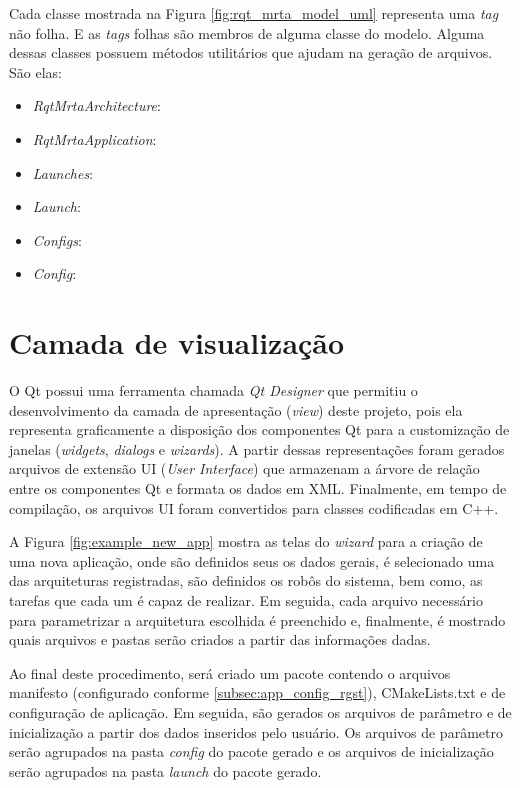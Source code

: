         Cada classe mostrada na Figura \ref{fig:rqt_mrta_model_uml} representa uma \textit{tag} não folha. E as \textit{tags} folhas são membros de alguma classe do modelo. Alguma dessas classes possuem métodos utilitários que ajudam na geração de arquivos. São elas:
        
        \begin{itemize}
            \item \textit{RqtMrtaArchitecture}:
            \item \textit{RqtMrtaApplication}:
            \item \textit{Launches}:
            \item \textit{Launch}:
            \item \textit{Configs}:
            \item \textit{Config}:
            
        \end{itemize}
        
    \section{Camada de visualização} \label{subsec:rqt_mrta_view}
        O Qt \cite{ref:yafei2012qt} possui uma ferramenta chamada \textit{Qt Designer} que permitiu o desenvolvimento da camada de apresentação (\textit{view}) deste projeto, pois ela representa graficamente a disposição dos componentes Qt para a customização de janelas (\textit{widgets}, \textit{dialogs} e \textit{wizards}). A partir dessas representações foram gerados arquivos de extensão UI (\textit{User Interface}) que armazenam a árvore de relação entre os componentes Qt e formata os dados em XML. Finalmente, em tempo de compilação, os arquivos UI foram convertidos para classes codificadas em C++.
        
        A Figura \ref{fig:example_new_app} mostra as telas do \textit{wizard} para a criação de uma nova aplicação, onde são definidos seus os dados gerais, é selecionado uma das arquiteturas registradas, são definidos os robôs do sistema, bem como, as tarefas que cada um é capaz de realizar. Em seguida, cada arquivo necessário para parametrizar a arquitetura escolhida é preenchido e, finalmente, é mostrado quais arquivos e pastas serão criados a partir das informações dadas. 
        
        Ao final deste procedimento, será criado um pacote contendo o arquivos manifesto (configurado conforme \ref{subsec:app_config_rgst}), CMakeLists.txt e de configuração de aplicação. Em seguida, são gerados os arquivos de parâmetro e de inicialização a partir dos dados inseridos pelo usuário. Os arquivos de parâmetro serão agrupados na pasta \textit{config} do pacote gerado e os arquivos de inicialização serão agrupados na pasta \textit{launch} do pacote gerado.
        

